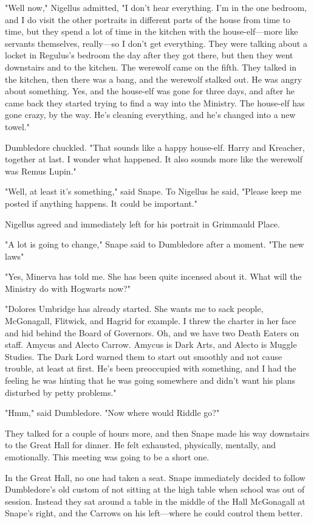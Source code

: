 "Well now," Nigellus admitted, "I don't hear everything. I'm in the one bedroom, and I do visit the other portraits in different parts of the house from time to time, but they spend a lot of time in the kitchen with the house-elf—more like servants themselves, really—so I don't get everything. They were talking about a locket in Regulus's bedroom the day after they got there, but then they went downstairs and to the kitchen. The werewolf came on the fifth. They talked in the kitchen, then there was a bang, and the werewolf stalked out. He was angry about something. Yes, and the house-elf was gone for three days, and after he came back they started trying to find a way into the Ministry. The house-elf has gone crazy, by the way. He's cleaning everything, and he's changed into a new towel."

Dumbledore chuckled. "That sounds like a happy house-elf. Harry and Kreacher, together at last. I wonder what happened. It also sounds more like the werewolf was Remus Lupin."

"Well, at least it's something," said Snape. To Nigellus he said, "Please keep me posted if anything happens. It could be important."

Nigellus agreed and immediately left for his portrait in Grimmauld Place.

"A lot is going to change," Snape said to Dumbledore after a moment. "The new laws{\el}"

"Yes, Minerva has told me. She has been quite incensed about it. What will the Ministry do with Hogwarts now?"

"Dolores Umbridge has already started. She wants me to sack people, McGonagall, Flitwick, and Hagrid for example. I threw the charter in her face and hid behind the Board of Governors. Oh, and we have two Death Eaters on staff. Amycus and Alecto Carrow. Amycus is Dark Arts, and Alecto is Muggle Studies. The Dark Lord warned them to start out smoothly and not cause trouble, at least at first. He's been preoccupied with something, and I had the feeling he was hinting that he was going somewhere and didn't want his plans disturbed by petty problems."

"Hmm," said Dumbledore. "Now where would Riddle go?"

They talked for a couple of hours more, and then Snape made his way downstairs to the Great Hall for dinner. He felt exhausted, physically, mentally, and emotionally. This meeting was going to be a short one.

In the Great Hall, no one had taken a seat. Snape immediately decided to follow Dumbledore's old custom of not sitting at the high table when school was out of session. Instead they sat around a table in the middle of the Hall McGonagall at Snape's right, and the Carrows on his left—where he could control them better.

